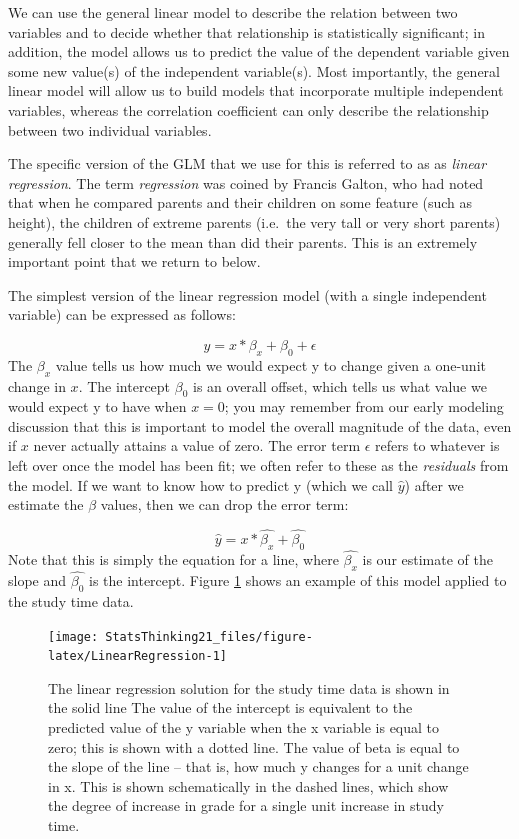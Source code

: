 \documentclass[12pt,]{book}
\theoremstyle{definition}
\theoremstyle{definition}
\theoremstyle{definition}
\theoremstyle{remark}
\begin{document}
We can use the general linear model to describe the relation between two variables and to decide whether that relationship is statistically significant; in addition, the model allows us to predict the value of the dependent variable given some new value(s) of the independent variable(s). Most importantly, the general linear model will allow us to build models that incorporate multiple independent variables, whereas the correlation coefficient can only describe the relationship between two individual variables.

The specific version of the GLM that we use for this is referred to as as \emph{linear regression}. The term \emph{regression} was coined by Francis Galton, who had noted that when he compared parents and their children on some feature (such as height), the children of extreme parents (i.e.~the very tall or very short parents) generally fell closer to the mean than did their parents. This is an extremely important point that we return to below.

The simplest version of the linear regression model (with a single independent variable) can be expressed as follows:

\[
y = x * \beta_x + \beta_0 + \epsilon
\]
The \(\beta_x\) value tells us how much we would expect y to change given a one-unit change in \(x\). The intercept \(\beta_0\) is an overall offset, which tells us what value we would expect y to have when \(x=0\); you may remember from our early modeling discussion that this is important to model the overall magnitude of the data, even if \(x\) never actually attains a value of zero. The error term \(\epsilon\) refers to whatever is left over once the model has been fit; we often refer to these as the \emph{residuals} from the model. If we want to know how to predict y (which we call \(\hat{y}\)) after we estimate the \(\beta\) values, then we can drop the error term:

\[
\hat{y} = x * \hat{\beta_x} + \hat{\beta_0} 
\]
Note that this is simply the equation for a line, where \(\hat{\beta_x}\) is our estimate of the slope and \(\hat{\beta_0}\) is the intercept. Figure \ref{fig:LinearRegression} shows an example of this model applied to the study time data.

\begin{figure}
\texttt{[image: StatsThinking21\_files/figure-latex/LinearRegression-1]} \caption{The linear regression solution for the study time data is shown in the solid line The value of the intercept is equivalent to the predicted value of the y variable when the x variable is equal to zero; this is shown with a dotted line.  The value of beta is equal to the slope of the line -- that is, how much y changes for a unit change in x.  This is shown schematically in the dashed lines, which show the degree of increase in grade for a single unit increase in study time.}\label{fig:LinearRegression}
\end{figure}
\end{document}
